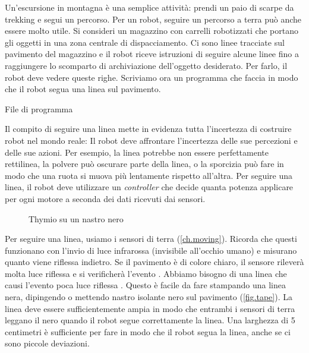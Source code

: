 
\label{ch.line}

Un'escursione in montagna è una semplice attività:
prendi un paio di scarpe da trekking e segui un percorso.
Per un robot, seguire un percorso a terra può anche essere molto utile.
Si consideri un magazzino con carrelli robotizzati che portano gli oggetti in una zona centrale di dispacciamento.
Ci sono linee tracciate sul pavimento del magazzino e il robot riceve istruzioni di seguire
alcune linee fino a raggiungere lo scomparto di archiviazione dell'oggetto desiderato.
Per farlo, il robot deve vedere queste righe.
Scriviamo ora un programma che faccia in modo che il robot segua una linea sul pavimento.

{\raggedleft \hfill File di programma }

Il compito di seguire una linea mette in evidenza tutta l'incertezza di costruire
robot nel mondo reale: Il robot deve affrontare l'incertezza delle sue percezioni
e delle sue azioni.
Per esempio, la linea potrebbe non essere perfettamente rettilinea, la polvere può oscurare parte della linea, o la sporcizia può fare in modo che una ruota si muova più lentamente rispetto all'altra.
Per seguire una linea, il robot deve utilizzare un
\emph{controller}  che decide quanta potenza applicare per ogni motore
a seconda dei dati ricevuti dai sensori.


\begin{figure}
	\hfill
	\caption{Thymio su un nastro nero}
\end{figure}

Per seguire una linea, usiamo i sensori di terra (\cref{ch.moving}).
Ricorda che questi funzionano con l'invio di luce infrarossa (invisibile all'occhio umano) e misurano quanto viene riflessa indietro.
Se il pavimento è di colore chiaro, il sensore rileverà molta luce riflessa
e si verificherà  l'evento . Abbiamo bisogno di una linea
che causi l'evento poca luce riflessa
. Questo è facile da fare stampando una linea nera, dipingendo o mettendo nastro isolante nero sul pavimento (\cref{fig.tape}). La linea deve
essere sufficientemente ampia in modo che entrambi i sensori di terra leggano il nero quando il
robot segue correttamente la linea. Una larghezza di 5
centimetri è sufficiente per fare in modo che il robot segua la linea, anche se ci
sono piccole deviazioni.

